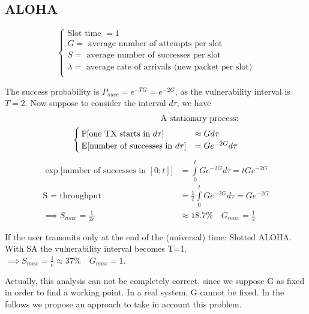 \subsection{ALOHA}
\begin{equation*}
	\begin{cases}
		\text{Slot time }= 1 \\
		G = \text{ average number of attempts per slot} \\
		S = \text{ average number of successes per slot} \\
		\lambda = \text{ average rate of arrivals (new packet per slot)} \\
	\end{cases}
\end{equation*}

The success probability is $P_{succ} = e^{-T G} = e^{-2 G}$, as the vulnerability interval is $T=2$.
Now suppose to consider the interval $d\tau$, we have
\begin{equation}\begin{split}
	\text{A stationary process:} \\
	\begin{cases}
		\mathbb{P}[\text{one TX starts in $d\tau$}] &\approx G d\tau\\
		\mathbb{E}[\text{number of successes in $d\tau$}] &= G e^{-2 G} d\tau \\
	\end{cases}
	\end{split}
	\end{equation}
	\begin{equation}\begin{split}
	\exp\bigg[\text{number of successes in $[0;t]$}\bigg] &= \int\limits_0^t G e^{-2 G}d\tau = t G e^{-2 G}\\
	\text{S = throughput }&=\frac{1}{t} \int\limits_0^t G e^{-2 G}d\tau = G e^{-2 G}\\
	\implies S_{max} = \frac{1}{2e}& \approx 18.7\% \quad G_{max} = \frac{1}{2}
\end{split}\end{equation}

If the user transmits only at the end of the (universal) time: Slotted ALOHA.
With SA the vulnerability interval becomes T=1. $\implies S_{max}=\frac{1}{e} \approx 37\% \quad G_{max} = 1$.

Actually, this analysis can not be completely correct, since we suppose G as fixed in order to find a working point. In a real system, G cannot be fixed. In the follows we propose an approach to take in account this problem.

